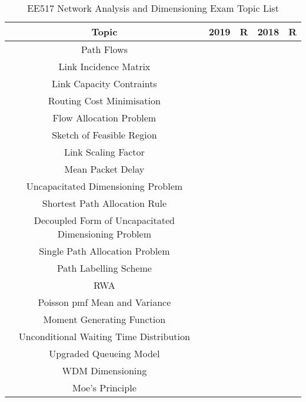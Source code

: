 \documentclass[a4paper]{article}
\begin{document}
\thispagestyle{empty}
	\begin{table}[h]
		\centering
		\caption{EE517 Network Analysis and Dimensioning Exam
		Topic List}
		\begin{tabular}{|c||c|c||c|c||}
			\hline
			\hline
			Topic & 2019 & R & 2018 & R \\
			\hline
			Path Flows & \checkmark &  & \checkmark &
			\checkmark \\
			Link Incidence Matrix & \checkmark & \checkmark &
			\checkmark & \checkmark \\
			Link Capacity Contraints & \checkmark & \checkmark &
			\checkmark & \checkmark \\
			Routing Cost Minimisation & \checkmark & \checkmark &
			\checkmark & \checkmark \\
			Flow Allocation Problem & \checkmark & \checkmark &
			\checkmark & \checkmark \\
			Sketch of Feasible Region & \checkmark &  &
			 &  \\
			Link Scaling Factor & \checkmark &  &
			 &  \\
			Mean Packet Delay & \checkmark &  &
			 &  \\
			Uncapacitated Dimensioning Problem & \checkmark & \checkmark &
			\checkmark &  \\
			Shortest Path Allocation Rule & \checkmark & \checkmark &
			\checkmark & \checkmark \\
			Decoupled Form of Uncapacitated Dimensioning Problem
			&\checkmark & & & \checkmark \\
			Single Path Allocation Problem & \checkmark &  &
			\checkmark &  \\
			Path Labelling Scheme & \checkmark & \checkmark &
			\checkmark & \checkmark \\
			RWA & \checkmark & \checkmark &
			\checkmark & \checkmark \\
			Poisson pmf Mean and Variance & \checkmark &  &
			\checkmark &  \\
			Moment Generating Function & \checkmark &  &
			\checkmark &  \\
			Unconditional Waiting Time Distribution & \checkmark &  &
			 & \checkmark \\
			Upgraded Queueing Model & \checkmark &  &
			 & \checkmark \\
			WDM Dimensioning & \checkmark & \checkmark &
			\checkmark & \checkmark \\
			Moe's Principle & \checkmark & \checkmark &
			\checkmark &  \\

\end{tabular}
\end{table}
\end{document}
